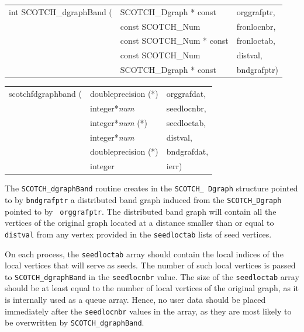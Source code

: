 \begin{itemize}
\progsyn

{\tt\begin{tabular}{l@{}ll}
int SCOTCH\_dgraphBand ( & SCOTCH\_Dgraph * const    & orggrafptr, \\
                         & const SCOTCH\_Num         & fronlocnbr, \\
                         & const SCOTCH\_Num * const & fronloctab, \\
                         & const SCOTCH\_Num         & distval,    \\
                         & SCOTCH\_Dgraph * const    & bndgrafptr) \\
\end{tabular}}

{\tt\begin{tabular}{l@{}ll}
scotchfdgraphband ( & doubleprecision (*)   & orggrafdat, \\
                    & integer*{\it num}     & seedlocnbr, \\
                    & integer*{\it num} (*) & seedloctab, \\
                    & integer*{\it num}     & distval,    \\
                    & doubleprecision (*)   & bndgrafdat, \\
                    & integer               & ierr)
\end{tabular}}

\progdes

The {\tt SCOTCH\_dgraphBand} routine creates in the {\tt SCOTCH\_\lbt
Dgraph} structure pointed to by {\tt bndgrafptr} a distributed band
graph induced from the {\tt SCOTCH\_\lbt Dgraph} pointed to by {\tt
orggrafptr}. The distributed band graph will contain all the vertices
of the original graph located at a distance smaller than or equal to
{\tt distval} from any vertex provided in the {\tt seedloctab} lists
of seed vertices.

On each process, the {\tt seedloctab} array should contain the local
indices of the local vertices that will serve as seeds. The number of
such local vertices is passed to {\tt SCOTCH\_\lbt dgraph\lbt Band} in
the {\tt seedlocnbr} value. The size of the {\tt seedloctab} array
should be at least equal to the number of local vertices of the
original graph, as it is internally used as a queue array. Hence, no
user data should be placed immediately after the {\tt seedlocnbr}
values in the array, as they are most likely to be overwritten by
{\tt SCOTCH\_\lbt dgraph\lbt Band}.


\end{itemize}
